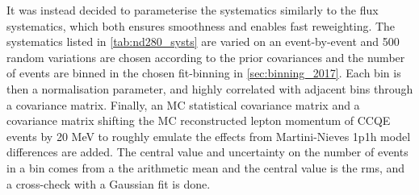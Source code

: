 It was instead decided to parameterise the systematics similarly to the flux systematics, which both ensures smoothness and enables fast reweighting. The systematics listed in \autoref{tab:nd280_systs} are varied on an event-by-event and 500 random variations are chosen according to the prior covariances and the number of events are binned in the chosen fit-binning in \autoref{sec:binning_2017}. Each bin is then a normalisation parameter, and highly correlated with adjacent bins through a covariance matrix. Finally, an MC statistical covariance matrix and a covariance matrix shifting the MC reconstructed lepton momentum of CCQE events by 20 MeV to roughly emulate the effects from Martini-Nieves 1p1h model differences are added. The central value and uncertainty on the number of events in a bin comes from a the arithmetic mean and the central value is the rms, and a cross-check with a Gaussian fit is done.

